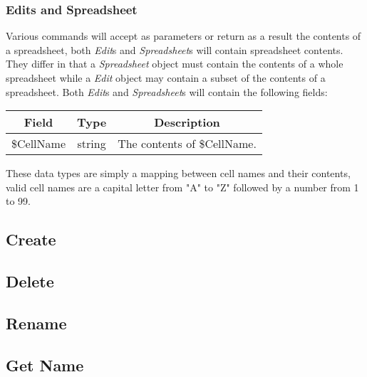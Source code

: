 \subsubsection{Edits and Spreadsheet}
\label{sec:message:edits}
\label{sec:message:spreadsheet}

Various commands will accept as parameters or return as a result the contents of a spreadsheet,
both \emph{Edit}s and \emph{Spreadsheet}s will contain spreadsheet contents. They differ in that
a \emph{Spreadsheet} object must contain the contents of a whole spreadsheet while a \emph{Edit}
object may contain a subset of the contents of a spreadsheet. Both \emph{Edit}s and \emph{Spreadsheet}s
will contain the following fields:

\begin{table}[H]
    \begin{center}
        \begin{tabular}{|c|c|c|}\hline
            Field & Type & Description \\\hline
            \$CellName & string & The contents of \$CellName. \\\hline
        \end{tabular}
    \end{center}
\end{table}

These data types are simply a mapping between cell names and their contents, valid cell names are a
capital letter from "A" to "Z" followed by a number from 1 to 99.

\subsection{Create}
\label{sec:message:create}


\subsection{Delete}
\label{sec:message:delete}


\subsection{Rename}
\label{sec:message:rename}


\subsection{Get Name}
\label{sec:message:get_name}


